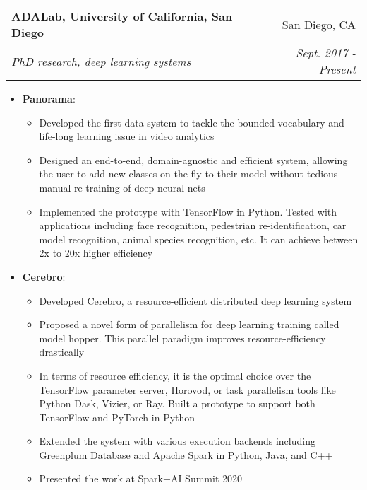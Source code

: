 \documentclass[letterpaper,11pt]{article}
\makeatletter
\newcommand{\resumeItem}[2]{
 \item\small{
  \textbf{#1}{: #2 \vspace{-2pt}}
 }
}
\newcommand{\resumeSubheading}[4]{
 \vspace{-1pt}\item
  \begin{tabular*}{0.97\textwidth}[t]{l@{\extracolsep{\fill}}r}
   \textbf{#1} & #2 \\
   \textit{\small#3} & \textit{\small #4}
  \end{tabular*}\vspace{-5pt}
}
\newcommand{\resumeItemListStart}{\begin{itemize}}
\newcommand{\resumeItemListEnd}{\end{itemize}\vspace{-5pt}}
\makeatother
\begin{document}
  \resumeSubheading
   {ADALab, University of California, San Diego}{San Diego, CA}
   {PhD research, deep learning systems}{Sept. 2017 - Present}
   
   \resumeItemListStart
    \resumeItem{Panorama}
     {}
     {\small
      \begin{itemize}
         \item Developed the first data system to tackle the bounded vocabulary and life-long learning issue in video analytics \vspace{-2pt}
        	 \item Designed an end-to-end, domain-agnostic and efficient system, allowing the user to add new classes on-the-fly to their model without tedious manual re-training of deep neural nets \vspace{-2pt}
	     \item Implemented the prototype with TensorFlow in Python. Tested with applications including face recognition, pedestrian re-identification, car model recognition, animal species recognition, etc. It can achieve between 2x to 20x higher efficiency \vspace{-2pt}
      \end{itemize}
     }
     \resumeItem{Cerebro}
     {}
     {\small 
     \begin{itemize}
         \item Developed Cerebro, a resource-efficient distributed deep learning system \vspace{-2pt}
        	 \item Proposed a novel form of parallelism for deep learning training called model hopper. This parallel paradigm improves resource-efficiency drastically\vspace{-2pt}
	     \item In terms of resource efficiency, it is the optimal choice over the TensorFlow parameter server, Horovod, or task parallelism tools like Python Dask, Vizier, or Ray. Built a prototype to support both TensorFlow and PyTorch in Python\vspace{-2pt}
	     \item Extended the system with various execution backends including Greenplum Database and Apache Spark in Python, Java, and C++
	     \item Presented the work at Spark+AI Summit 2020
      \end{itemize}\vspace{-5pt}
      }
   \resumeItemListEnd
\end{document}
